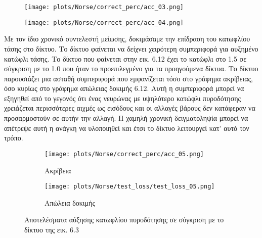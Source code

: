 \documentclass[12pt]{report}
\begin{document}
\begin{figure}
\centering
\begin{minipage}{.4\textwidth}
  \centering
  \texttt{[image: plots/Norse/correct\_perc/acc\_03.png]}
  \label{fig:test1}
\end{minipage}
\begin{minipage}{.4\textwidth}
  \centering
  \texttt{[image: plots/Norse/correct\_perc/acc\_04.png]}
  \label{fig:test2}
\end{minipage}
\end{figure}

Με τον ίδιο χρονικό συντελεστή μείωσης, δοκιμάσαμε την επίδραση του κατωφλίου τάσης στο δίκτυο. Το δίκτυο φαίνεται να δείχνει χειρότερη συμπεριφορά για αυξημένο κατώφλι τάσης. Το δίκτυο που φαίνεται στην εικ. 6.12 έχει το κατώφλι στο 1.5 σε σύγκριση με το 1.0 που ήταν το προεπιλεγμένο για τα προηγούμενα δίκτυα. Το δίκτυο παρουσιάζει μια ασταθή συμπεριφορά που εμφανίζεται τόσο στο γράφημα ακρίβειας, όσο κυρίως στο γράφημα απώλειας δοκιμής 6.12. Αυτή η συμπεριφορά μπορεί να εξηγηθεί από το γεγονός ότι ένας νευρώνας με υψηλότερο κατώφλι πυροδότησης χρειάζεται περισσότερες αιχμές ως εισόδους και οι αλλαγές βάρους δεν κατάφεραν να προσαρμοστούν σε αυτήν την αλλαγή. Η χαμηλή χρονική δειγματοληψία μπορεί να απέτρεψε αυτή η ανάγκη να υλοποιηθεί και έτσι το δίκτυο λειτουργεί κατ' αυτό τον τρόπο.

\begin{figure}
\centering
\begin{subfigure}{.5\textwidth}
  \centering
  \texttt{[image: plots/Norse/correct\_perc/acc\_05.png]}
  \caption{Ακρίβεια}
  \label{fig:sub1}
\end{subfigure}%
\begin{subfigure}{.5\textwidth}
  \centering
  \texttt{[image: plots/Norse/test\_loss/test\_loss\_05.png]}
  \caption{Απώλεια δοκιμής}
  \label{fig:sub2}
\end{subfigure}
\caption{Αποτελέσματα αύξησης κατωφλίου πυροδότησης σε σύγκριση με το δίκτυο της εικ. 6.3}
\label{fig:test}
\end{figure}
\end{document}
